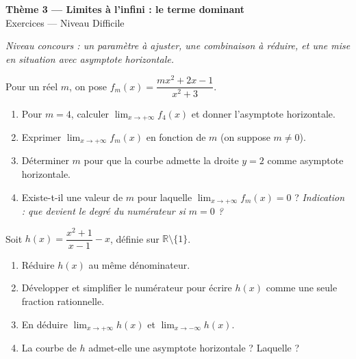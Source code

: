 \documentclass[11pt,a4paper]{article}
\newcommand{\R}{\mathbb{R}}
\begin{document}
\begin{center}
{\Large\bfseries\color{primarydark}Thème 3 — Limites à l'infini : le terme dominant}\\[2pt]
{\large\color{primary}Exercices — Niveau Difficile}
\end{center}
\vspace{4pt}
{\small\itshape Niveau concours : un paramètre à ajuster, une combinaison à réduire, et une mise en
situation avec asymptote horizontale.}
\vspace{6pt}

\begin{exercice}
Pour un réel $m$, on pose $f_m(x)=\dfrac{m x^2+2x-1}{x^2+3}$.
\begin{enumerate}[label=\alph*),leftmargin=2em,itemsep=3pt]
  \item Pour $m=4$, calculer $\displaystyle\lim_{x\to+\infty} f_4(x)$ et donner l'asymptote horizontale.
  \item Exprimer $\displaystyle\lim_{x\to+\infty} f_m(x)$ en fonction de $m$ (on suppose $m\neq 0$).
  \item Déterminer $m$ pour que la courbe admette la droite $y=2$ comme asymptote horizontale.
  \item Existe-t-il une valeur de $m$ pour laquelle $\displaystyle\lim_{x\to+\infty} f_m(x)=0$ ?
        \emph{Indication : que devient le degré du numérateur si $m=0$ ?}
\end{enumerate}
\end{exercice}

\begin{exercice}
Soit $h(x)=\dfrac{x^2+1}{x-1}-x$, définie sur $\R\setminus\{1\}$.
\begin{enumerate}[label=\alph*),leftmargin=2em,itemsep=3pt]
  \item Réduire $h(x)$ au même dénominateur.
  \item Développer et simplifier le numérateur pour écrire $h(x)$ comme une seule fraction rationnelle.
  \item En déduire $\displaystyle\lim_{x\to+\infty} h(x)$ et $\displaystyle\lim_{x\to-\infty} h(x)$.
  \item La courbe de $h$ admet-elle une asymptote horizontale ? Laquelle ?
\end{enumerate}
\end{exercice}
\end{document}
